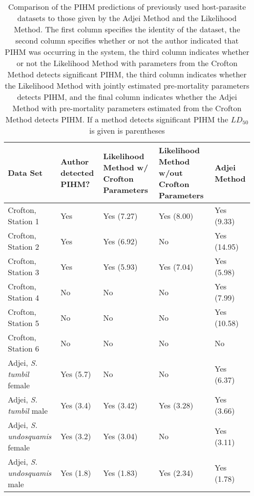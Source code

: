 \documentclass[12pt, a4paper]{article}
\begin{document}
\renewcommand{\arraystretch}{1.2}
\begin{sidewaystable}

    \caption{Comparison of the PIHM predictions of previously used host-parasite datasets to those given by the Adjei Method and the Likelihood Method. The first column specifies the identity of the dataset, the second column specifies whether or not the author indicated that PIHM was occurring in the system, the third column indicates whether or not the Likelihood Method with parameters from the Crofton Method detects significant PIHM, the third column indicates whether the Likelihood Method with jointly estimated pre-mortality parameters detects PIHM, and the final column indicates whether the Adjei Method with pre-mortality parameters estimated from the Crofton Method detects PIHM.  If a method detects significant PIHM the $LD_{50}$ is given is parentheses}

    \centering
    \begin{tabular}{l l p{3cm} p{3cm} l}

    \hline\hline
    Data Set & Author detected PIHM? & Likelihood Method w/ Crofton Parameters & Likelihood Method w/out Crofton Parameters & Adjei Method \\

    \hline
    Crofton, Station 1 & Yes & Yes (7.27) & Yes (8.00) & Yes (9.33) \\
    Crofton, Station 2 & Yes & Yes (6.92) & No & Yes (14.95)\\
    Crofton, Station 3 & Yes & Yes (5.93) & Yes (7.04) & Yes (5.98) \\
    Crofton, Station 4 & No & No & No & Yes (7.99) \\
    Crofton, Station 5 & No & No & No & Yes (10.58) \\
    Crofton, Station 6 & No & No & No & No \\
    Adjei, \emph{S. tumbil} female & Yes (5.7) & No  & No   & Yes (6.37) \\
    Adjei, \emph{S. tumbil} male & Yes (3.4) & Yes (3.42) & Yes (3.28) & Yes (3.66)  \\
    Adjei, \emph{S. undosquamis} female & Yes (3.2) & Yes (3.04) & No  & Yes (3.11) \\
    Adjei, \emph{S. undosquamis} male & Yes (1.8) & Yes (1.83) & Yes (2.34) & Yes (1.78) \\


    \end{tabular}
    \label{table:pihm}


\end{sidewaystable}
\end{document}
